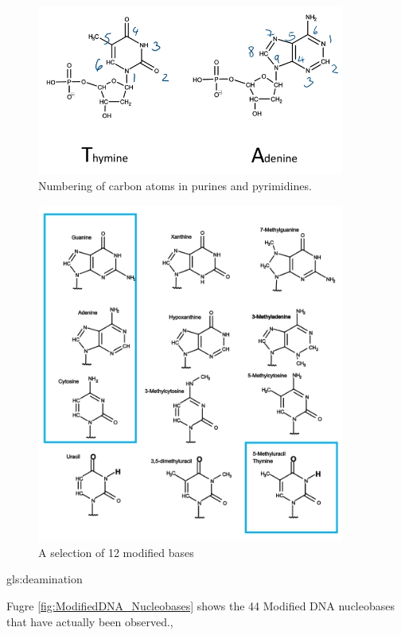 \documentclass[]{article}
\begin{document}
\begin{figure}[H]
	\caption{Numbering of carbon atoms in purines and pyrimidines. }\label{fig:NucleotidesCounting} 
	\includegraphics[width=0.9\textwidth]{NucleotidesCounting}
\end{figure}

\begin{figure}[H]
	\caption{A selection of 12 modified bases}\label{fig:ModifiedBases} 
	\includegraphics[width=0.9\textwidth]{ModifiedBases}
\end{figure}

\gls{gls:deamination}

Fugre \ref{fig:ModifiedDNA_Nucleobases} shows the 44 Modified DNA nucleobases that have actually been observed.\cite{sood2019dnamod},\cite{sood2019dnamod_website}
\end{document}
